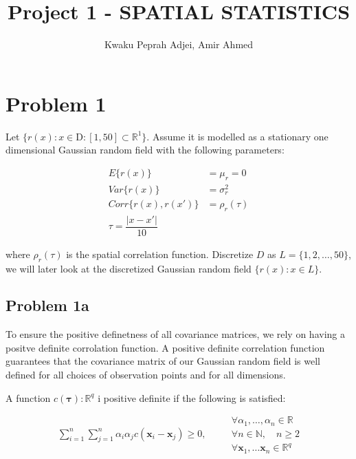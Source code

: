 \documentclass[]{article}
\title{Project 1 - SPATIAL STATISTICS}
\author{Kwaku Peprah Adjei, Amir Ahmed}
\date{}
\newcommand{\vect}[1]{\ensuremath{\boldsymbol{\mathbf{#1}}}}
\begin{document}
\maketitle

\newpage

\section{Problem 1}\label{problem-1}

Let
\(\lbrace r(x) : x \in \text{D} : \left[1, 50\right]\subset\mathbb{R}^1\rbrace\).
Assume it is modelled as a stationary one dimensional Gaussian random
field with the following parameters:

\begin{equation}\label{prob1eq}
    \begin{split}
    E\lbrace r(x) \rbrace &= \mu_r = 0 \\
    Var\lbrace r(x)\rbrace &= \sigma_r^2 \\
    Corr\lbrace r(x), r(x')\rbrace &= \rho_r(\tau) \\
    \tau = \dfrac{|x-x'|}{10}
    \end{split}
\end{equation}

where \(\rho_r(\tau)\) is the spatial correlation function. Discretize
\(D\) as \(L = \lbrace 1, 2, \dots, 50 \rbrace\), we will later look at
the discretized Gaussian random field \(\lbrace r(x) : x\in L \rbrace\).

\subsection{Problem 1a}\label{problem-1a}

To ensure the positive definetness of all covariance matrices, we rely
on having a positve definite corrolation function. A positive definite
correlation function guarantees that the covariance matrix of our
Gaussian random field is well defined for all choices of observation
points and for all dimensions.

A function \(c(\vect \tau): \mathbb{R}^q\) i positive definite if the
following is satisfied:

\begin{equation}\label{posdefeq}
    \begin{split}
        \sum_{i=1}^n\sum_{j=1}^n\alpha_i\alpha_j c(\vect x_i - \vect x_j) \geq 0,
    \end{split}
    \quad
    \begin{split}
        &\forall \alpha_1, \dots, \alpha_n \in \mathbb{R} \\
        &\forall n \in \mathbb{N}, \quad n \geq 2 \\
        &\forall \vect x_1, \dots \vect x_n \in \mathbb{R}^q
  \end{split}
\end{equation}
\end{document}
